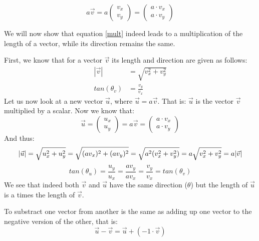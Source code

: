 \documentclass[a4paper]{report}
\begin{document}
\begin{equation}
a\vec{v} = a
\begin{pmatrix}
v_x \\
v_y
\end{pmatrix}
=
\begin{pmatrix}
a \cdot v_x \\
a \cdot v_y
\end{pmatrix}
\label{mult}
\end{equation}
\begin{mdframed}
We will now show that equation \ref{mult} indeed leads to a multiplication of the length of a vector, while its direction remains the same.

First, we know that for a vector $\vec{v}$ its length and direction are given as follows:
\begin{align*}
|\vec{v}| &= \sqrt{v_x^2 + v_y^2}\\
tan(\theta_v) &= \frac{v_y}{v_x}
\end{align*}
Let us now look at a new vector $\vec{u}$, where $\vec{u}=a\vec{v}$. That is: $\vec{u}$ is the vector $\vec{v}$ multiplied by a scalar. Now we know that:
\begin{equation*}
\vec{u} =
\begin{pmatrix}
u_x \\
u_y
\end{pmatrix}
= 
a \vec{v}
=
\begin{pmatrix}
a\cdot v_x\\
a\cdot v_y
\end{pmatrix}
\end{equation*}
And thus:
\begin{equation*}
|\vec{u}| = \sqrt{u_x^2 + u_y^2} = \sqrt{(a v_x)^2 + (a v_y)^2} = \sqrt{a^2 (v_x^2 + v_y^2)} = a \sqrt{v_x^2 + v_y^2} = a |\vec{v}| \\
\end{equation*}
\begin{equation*}
tan(\theta_u) = \frac{u_y}{u_x} = \frac{av_y}{av_x} = \frac{v_y}{v_x} = tan(\theta_v) 
\end{equation*}
We see that indeed both $\vec{v}$ and $\vec{u}$ have the same direction ($\theta$) but the length of $\vec{u}$ is a times the length of $\vec{v}$.
\end{mdframed}
\begin{mdframed}
To substract one vector from another is the same as adding up one vector to the negative version of the other, that is:
\begin{equation*}
\vec{u}-\vec{v} = \vec{u} + \left( -1 \cdot \vec{v}\right)
\end{equation*}
\end{mdframed}
\end{document}
